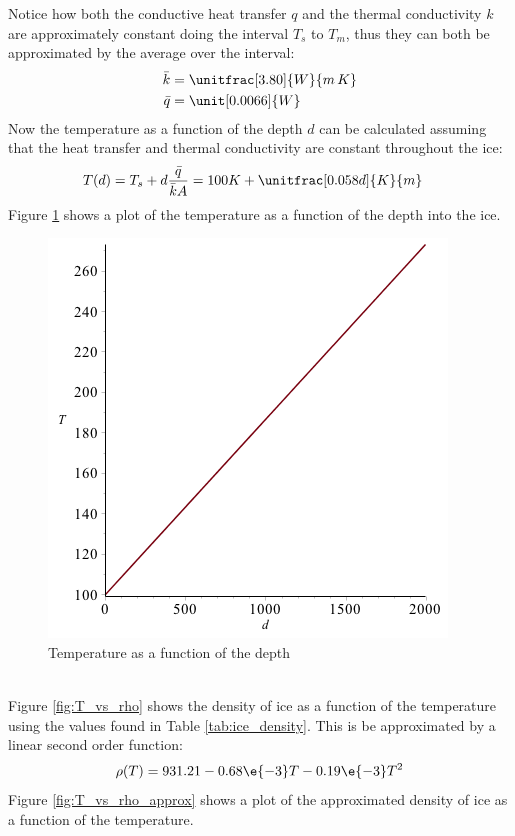 Notice how both the conductive heat transfer $q$ and the thermal conductivity $k$ are approximately constant doing the interval $T_s$ to $T_m$, thus they can both be approximated by the average over the interval:
\begin{align}
	\bar{k} &= \unitfrac[3.80]{W}{m \, K} \\
	\bar{q} &= \unit[0.0066]{W}
\end{align}
Now the temperature as a function of the depth $d$ can be calculated assuming that the heat transfer and thermal conductivity are constant throughout the ice:
\begin{align}\label{eq:T_d}
	T(d) &= T_s + d \frac{\bar{q}}{\bar{k} A} = 100 K + \unitfrac[0.058 d]{K}{m}
\end{align}
Figure \ref{fig:d_vs_T} shows a plot of the temperature as a function of the depth into the ice.
\begin{figure}[htb]
	\centering
	\includegraphics[width=.48\textwidth]{figures/temperature/d_vs_T}
	\caption{Temperature as a function of the depth}
	\label{fig:d_vs_T}
\end{figure}
\\
Figure \ref{fig:T_vs_rho} shows the density of ice as a function of the temperature using the values found in Table \ref{tab:ice_density}. This is be approximated by a linear second order function:
\begin{equation}\label{eq:rho_approx}
	\rho(T) = 931.21 - 0.68 \e{-3} T - 0.19 \e{-3} T^2
\end{equation}
Figure \ref{fig:T_vs_rho_approx} shows a plot of the approximated density of ice as a function of the temperature.

